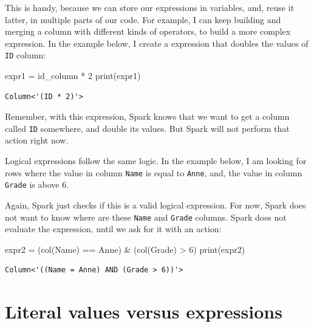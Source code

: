 \documentclass[
  11pt,
  letterpaper,
  DIV=11,
  numbers=noendperiod]{scrreprt}
\newenvironment{Shaded}{\begin{snugshade}}{\end{snugshade}}
\newcommand{\BuiltInTok}[1]{\textcolor[rgb]{0.00,0.23,0.31}{#1}}
\newcommand{\DecValTok}[1]{\textcolor[rgb]{0.68,0.00,0.00}{#1}}
\newcommand{\NormalTok}[1]{\textcolor[rgb]{0.00,0.23,0.31}{#1}}
\newcommand{\OperatorTok}[1]{\textcolor[rgb]{0.37,0.37,0.37}{#1}}
\newcommand{\StringTok}[1]{\textcolor[rgb]{0.13,0.47,0.30}{#1}}
\begin{document}
This is handy, because we can store our expressions in variables, and,
reuse it latter, in multiple parts of our code. For example, I can keep
building and merging a column with different kinds of operators, to
build a more complex expression. In the example below, I create a
expression that doubles the values of \texttt{ID} column:

\begin{Shaded}
\begin{Highlighting}[]
\NormalTok{expr1 }\OperatorTok{=}\NormalTok{ id\_column }\OperatorTok{*} \DecValTok{2}
\BuiltInTok{print}\NormalTok{(expr1)}
\end{Highlighting}
\end{Shaded}

\begin{verbatim}
Column<'(ID * 2)'>
\end{verbatim}

Remember, with this expression, Spark knows that we want to get a column
called \texttt{ID} somewhere, and double its values. But Spark will not
perform that action right now.

Logical expressions follow the same logic. In the example below, I am
looking for rows where the value in column \texttt{Name} is equal to
\texttt{\textquotesingle{}Anne\textquotesingle{}}, and, the value in
column \texttt{Grade} is above 6.

Again, Spark just checks if this is a valid logical expression. For now,
Spark does not want to know where are these \texttt{Name} and
\texttt{Grade} columns. Spark does not evaluate the expression, until we
ask for it with an action:

\begin{Shaded}
\begin{Highlighting}[]
\NormalTok{expr2 }\OperatorTok{=}\NormalTok{ (col(}\StringTok{\textquotesingle{}Name\textquotesingle{}}\NormalTok{) }\OperatorTok{==} \StringTok{\textquotesingle{}Anne\textquotesingle{}}\NormalTok{) }\OperatorTok{\&}\NormalTok{ (col(}\StringTok{\textquotesingle{}Grade\textquotesingle{}}\NormalTok{) }\OperatorTok{\textgreater{}} \DecValTok{6}\NormalTok{)}
\BuiltInTok{print}\NormalTok{(expr2)}
\end{Highlighting}
\end{Shaded}

\begin{verbatim}
Column<'((Name = Anne) AND (Grade > 6))'>
\end{verbatim}

\section{Literal values versus
expressions}\label{literal-values-versus-expressions}
\end{document}
